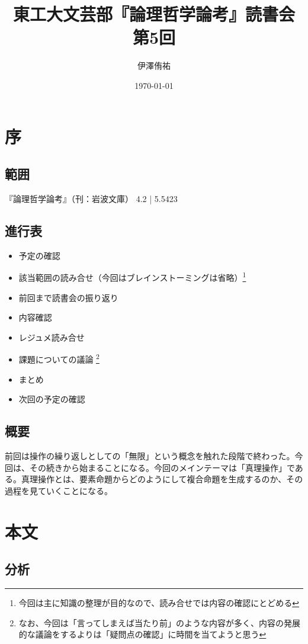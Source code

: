 \documentclass[a4paper,onecolumn,article]{jarticle}
\title{東工大文芸部『論理哲学論考』読書会 第5回}
\author{伊澤侑祐}
\date{\today}
\newcounter{ct}               %
\begin{document}
\maketitle

\section{序}
\subsection*{範囲}
『論理哲学論考』（刊：岩波文庫） 4.2 | 5.5423
\subsection*{進行表}

\begin{itemize}
  \item 予定の確認
  \item 該当範囲の読み合せ（今回はブレインストーミングは省略）\footnote{今回は主に知識の整理が目的なので、読み合せでは内容の確認にとどめる}
  \item 前回まで読書会の振り返り
  \item 内容確認
  \item レジュメ読み合せ
  \item 課題についての議論 \footnote{なお、今回は「言ってしまえば当たり前」のような内容が多く、内容の発展的な議論をするよりは「疑問点の確認」に時間を当てようと思う}
  \item まとめ
  \item 次回の予定の確認
\end{itemize}

\subsection{概要}
前回は操作の繰り返しとしての「無限」という概念を触れた段階で終わった。今回は、その続きから始まることになる。今回のメインテーマは「真理操作」である。真理操作とは、要素命題からどのようにして複合命題を生成するのか、その過程を見ていくことになる。

\section{本文}

\subsection{分析}
\end{document}
